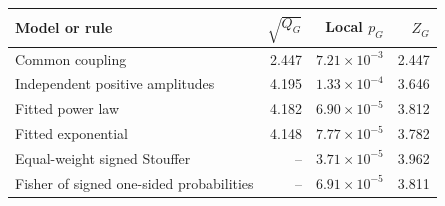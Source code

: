 \begin{tabular}{lrrr}\toprule Model or rule & $\sqrt{Q_G}$ & Local $p_G$ & $Z_G$\\\midrule
Common coupling & 2.447 & $7.21\times10^{-3}$ & 2.447\\
Independent positive amplitudes & 4.195 & $1.33\times10^{-4}$ & 3.646\\
Fitted power law & 4.182 & $6.90\times10^{-5}$ & 3.812\\
Fitted exponential & 4.148 & $7.77\times10^{-5}$ & 3.782\\
Equal-weight signed Stouffer & -- & $3.71\times10^{-5}$ & 3.962\\
Fisher of signed one-sided probabilities & -- & $6.91\times10^{-5}$ & 3.811\\
\bottomrule\end{tabular}
